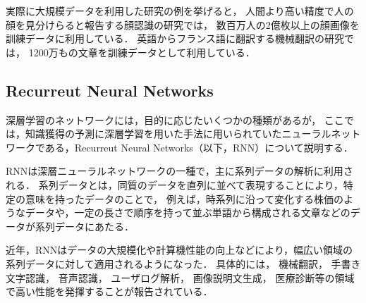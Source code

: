 実際に大規模データを利用した研究の例を挙げると，
人間より高い精度で人の顔を見分けらると報告する顔認識の研究\cite{schroff2015facenet}では，
数百万人の2億枚以上の顔画像を訓練データに利用している．
英語からフランス語に翻訳する機械翻訳の研究\cite{xu2015show}では，
1200万もの文章を訓練データとして利用している．


\subsection{Recurreut Neural Networks}
深層学習のネットワークには，目的に応じたいくつかの種類があるが，
ここでは，知識獲得の予測に深層学習を用いた手法\cite{piech2015deep}に用いられていたニューラルネットワークである，Recurreut Neural Networks\cite{williams1989learning}（以下，RNN）について説明する．


RNNは深層ニューラルネットワークの一種で，主に系列データの解析に利用される．
系列データとは，同質のデータを直列に並べて表現することにより，特定の意味を持ったデータのことで，
例えば，時系列に沿って変化する株価のようなデータや，一定の長さで順序を持って並ぶ単語から構成される文章などのデータが系列データにあたる．

近年，RNNはデータの大規模化や計算機性能の向上などにより，幅広い領域の系列データに対して適用されるようになった．
具体的には，
機械翻訳\cite{sutskever2014sequence, dong2015multi}，
手書き文字認識\cite{graves2009offline,louradour2014curriculum}，
音声認識\cite{hinton2012deep,bahdanau2015end}，
ユーザログ解析\cite{hidasi2015session}，
画像説明文生成\cite{xu2015show,vinyals2014show}，
医療診断\cite{choi2015doctor,lipton2015learning}等の領域で高い性能を発揮することが報告されている．

